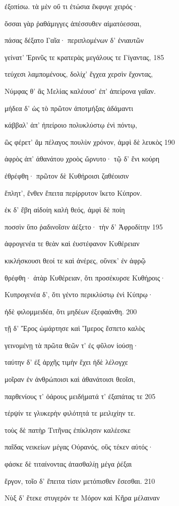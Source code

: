 ἐξοπίσω. τὰ μὲν οὔ τι ἐτώσια ἔκφυγε χειρός· 

ὅσσαι γὰρ ῥαθάμιγγες ἀπέσσυθεν αἱματόεσσαι,

πάσας δέξατο Γαῖα· περιπλομένων δ' ἐνιαυτῶν 

γείνατ' Ἐρινῦς τε κρατερὰς μεγάλους τε Γίγαντας, \num{185}

τεύχεσι λαμπομένους, δολίχ' ἔγχεα χερσὶν ἔχοντας,

Νύμφας θ' ἃς Μελίας καλέουσ' ἐπ' ἀπείρονα γαῖαν. 

μήδεα δ' ὡς τὸ πρῶτον ἀποτμήξας ἀδάμαντι

κάββαλ' ἀπ' ἠπείροιο πολυκλύστῳ ἐνὶ πόντῳ,

ὣς φέρετ' ἂμ πέλαγος πουλὺν χρόνον, ἀμφὶ δὲ λευκὸς \num{190}

ἀφρὸς ἀπ' ἀθανάτου χροὸς ὤρνυτο· τῷ δ' ἔνι κούρη 

ἐθρέφθη· πρῶτον δὲ Κυθήροισι ζαθέοισιν 

ἔπλητ', ἔνθεν ἔπειτα περίρρυτον ἵκετο Κύπρον.

ἐκ δ' ἔβη αἰδοίη καλὴ θεός, ἀμφὶ δὲ ποίη

ποσσὶν ὕπο ῥαδινοῖσιν ἀέξετο· τὴν δ' Ἀφροδίτην \num{195} 

ἀφρογενέα τε θεὰν καὶ ἐυστέφανον Κυθέρειαν

κικλήσκουσι θεοί τε καὶ ἀνέρες, οὕνεκ' ἐν ἀφρῷ

θρέφθη· ἀτὰρ Κυθέρειαν, ὅτι προσέκυρσε Κυθήροις· 

Κυπρογενέα δ', ὅτι γέντο περικλύστῳ ἐνὶ Κύπρῳ·

ἠδὲ φιλομμειδέα, ὅτι μηδέων ἐξεφαάνθη. \num{200}

τῇ δ' Ἔρος ὡμάρτησε καὶ Ἵμερος ἔσπετο καλὸς

γεινομένῃ τὰ πρῶτα θεῶν τ' ἐς φῦλον ἰούσῃ· 

ταύτην δ' ἐξ ἀρχῆς τιμὴν ἔχει ἠδὲ λέλογχε

μοῖραν ἐν ἀνθρώποισι καὶ ἀθανάτοισι θεοῖσι,

παρθενίους τ' ὀάρους μειδήματά τ' ἐξαπάτας τε \num{205}

τέρψίν τε γλυκερὴν φιλότητά τε μειλιχίην τε.

τοὺς δὲ πατὴρ Τιτῆνας ἐπίκλησιν καλέεσκε

παῖδας νεικείων μέγας Οὐρανός, οὓς τέκεν αὐτός· 

φάσκε δὲ τιταίνοντας ἀτασθαλίῃ μέγα ῥέξαι

ἔργον, τοῖο δ' ἔπειτα τίσιν μετόπισθεν ἔσεσθαι. \num{210}

Νὺξ δ' ἔτεκε στυγερόν τε Μόρον καὶ Κῆρα μέλαιναν 

